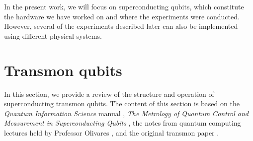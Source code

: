 In the present work, we will focus on superconducting qubits, which constitute the hardware we have worked on and where the experiments were conducted. 
However, several of the experiments described later can also be implemented using different physical systems.

\section{Transmon qubits}
In this section, we provide a review of the structure and operation of superconducting transmon qubits. 
The content of this section is based on the \textit{Quantum Information Science} manual \cite{manenti_quantum_2023}, \textit{The Metrology of Quantum Control and Measurement in Superconducting Qubits} \cite{Chen2018}, the notes from quantum computing lectures held by Professor Olivares \cite{Olivares2021}, and the original transmon paper \cite{TransmonPaper}.

